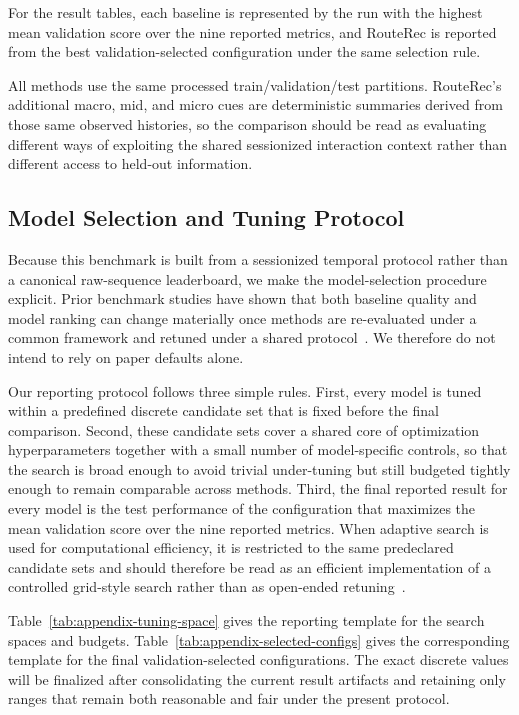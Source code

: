 \documentclass[sigconf,review,anonymous]{acmart}
\begin{document}
For the result tables, each baseline is represented by the run with the highest mean validation score over the nine reported metrics, and RouteRec is reported from the best validation-selected configuration under the same selection rule.

All methods use the same processed train/validation/test partitions. RouteRec's additional macro, mid, and micro cues are deterministic summaries derived from those same observed histories, so the comparison should be read as evaluating different ways of exploiting the shared sessionized interaction context rather than different access to held-out information.

\subsection{Model Selection and Tuning Protocol}

Because this benchmark is built from a sessionized temporal protocol rather than a canonical raw-sequence leaderboard, we make the model-selection procedure explicit. Prior benchmark studies have shown that both baseline quality and model ranking can change materially once methods are re-evaluated under a common framework and retuned under a shared protocol~\cite{latifi2021sessionaware,latifi2022seqstudy}. We therefore do not intend to rely on paper defaults alone.

Our reporting protocol follows three simple rules. First, every model is tuned within a predefined discrete candidate set that is fixed before the final comparison. Second, these candidate sets cover a shared core of optimization hyperparameters together with a small number of model-specific controls, so that the search is broad enough to avoid trivial under-tuning but still budgeted tightly enough to remain comparable across methods. Third, the final reported result for every model is the test performance of the configuration that maximizes the mean validation score over the nine reported metrics. When adaptive search is used for computational efficiency, it is restricted to the same predeclared candidate sets and should therefore be read as an efficient implementation of a controlled grid-style search rather than as open-ended retuning~\cite{galuzzi2020bayesopt}.

Table~\ref{tab:appendix-tuning-space} gives the reporting template for the search spaces and budgets. Table~\ref{tab:appendix-selected-configs} gives the corresponding template for the final validation-selected configurations. The exact discrete values will be finalized after consolidating the current result artifacts and retaining only ranges that remain both reasonable and fair under the present protocol.
\end{document}
